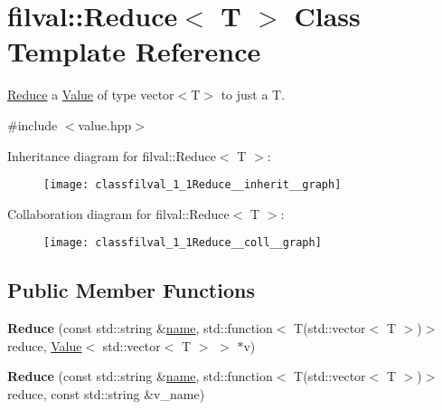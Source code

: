 \hypertarget{classfilval_1_1Reduce}{}\section{filval\+:\+:Reduce$<$ T $>$ Class Template Reference}
\label{classfilval_1_1Reduce}


\hyperlink{classfilval_1_1Reduce}{Reduce} a \hyperlink{classfilval_1_1Value}{Value} of type vector$<$\+T$>$ to just a T.  




{\ttfamily \#include $<$value.\+hpp$>$}



Inheritance diagram for filval\+:\+:Reduce$<$ T $>$\+:
\nopagebreak
\begin{figure}[H]
\begin{center}
\leavevmode
\texttt{[image: classfilval\_1\_1Reduce\_\_inherit\_\_graph]}
\end{center}
\end{figure}


Collaboration diagram for filval\+:\+:Reduce$<$ T $>$\+:
\nopagebreak
\begin{figure}[H]
\begin{center}
\leavevmode
\texttt{[image: classfilval\_1\_1Reduce\_\_coll\_\_graph]}
\end{center}
\end{figure}
\subsection*{Public Member Functions}
\begin{DoxyCompactItemize}
\item 
\hypertarget{classfilval_1_1Reduce_a64db8c7153ee1ddce2f2db01f77afc2c}{}\label{classfilval_1_1Reduce_a64db8c7153ee1ddce2f2db01f77afc2c} 
{\bfseries Reduce} (const std\+::string \&\hyperlink{classfilval_1_1GenValue_a007e38c03ee041c2a657afa3d6e91ab1}{name}, std\+::function$<$ T(std\+::vector$<$ T $>$)$>$ reduce, \hyperlink{classfilval_1_1Value}{Value}$<$ std\+::vector$<$ T $>$ $>$ $\ast$v)
\item 
\hypertarget{classfilval_1_1Reduce_a8834d0f43fb9cf687aade04bcf04981a}{}\label{classfilval_1_1Reduce_a8834d0f43fb9cf687aade04bcf04981a} 
{\bfseries Reduce} (const std\+::string \&\hyperlink{classfilval_1_1GenValue_a007e38c03ee041c2a657afa3d6e91ab1}{name}, std\+::function$<$ T(std\+::vector$<$ T $>$)$>$ reduce, const std\+::string \&v\+\_\+name)
\end{DoxyCompactItemize}

